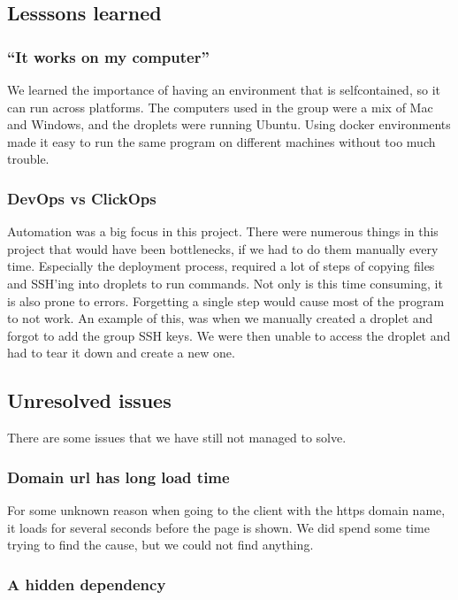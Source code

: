 \subsection{Lesssons learned}

\subsubsection{``It works on my computer''}

We learned the importance of having an environment that is 
selfcontained, so it can run across platforms.
The computers used in the group were a mix of Mac and Windows,
and the droplets were running Ubuntu. 
Using docker environments made it easy to run the same program
on different machines without too much trouble.

\subsubsection{DevOps vs ClickOps}

Automation was a big focus in this project.
There were numerous things in this project that 
would have been bottlenecks, if we had to do them manually every time.
Especially the deployment process, required a lot of steps
of copying files and SSH'ing into droplets to run commands.
Not only is this time consuming, it is also prone to errors.
Forgetting a single step would cause most of the program to not work.
An example of this, was when we manually created a droplet and forgot to add the 
group SSH keys. We were then unable to access the droplet and had to 
tear it down and create a new one.

\subsection{Unresolved issues}

There are some issues that we have still not managed to solve.

\subsubsection{Domain url has long load time}

For some unknown reason when going to the client with the https domain name, 
it loads for several seconds before the page is shown.
We did spend some time trying to find the cause,
but we could not find anything.

\subsubsection{A hidden dependency}

